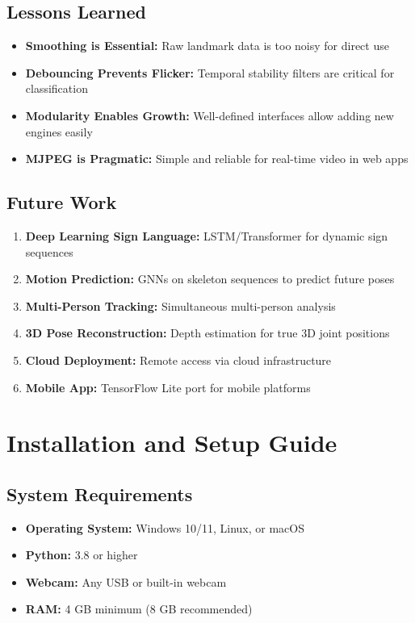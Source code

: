 \documentclass[a4paper,12pt]{report}
\begin{document}
\section{Lessons Learned}
\begin{itemize}
    \item \textbf{Smoothing is Essential:} Raw landmark data is too noisy for direct use
    \item \textbf{Debouncing Prevents Flicker:} Temporal stability filters are critical for classification
    \item \textbf{Modularity Enables Growth:} Well-defined interfaces allow adding new engines easily
    \item \textbf{MJPEG is Pragmatic:} Simple and reliable for real-time video in web apps
\end{itemize}

\section{Future Work}
\begin{enumerate}
    \item \textbf{Deep Learning Sign Language:} LSTM/Transformer for dynamic sign sequences
    \item \textbf{Motion Prediction:} GNNs on skeleton sequences to predict future poses
    \item \textbf{Multi-Person Tracking:} Simultaneous multi-person analysis
    \item \textbf{3D Pose Reconstruction:} Depth estimation for true 3D joint positions
    \item \textbf{Cloud Deployment:} Remote access via cloud infrastructure
    \item \textbf{Mobile App:} TensorFlow Lite port for mobile platforms
\end{enumerate}

\newpage

\appendix

\chapter{Installation and Setup Guide}
\thispagestyle{contentpages}

\section{System Requirements}
\begin{itemize}
    \item \textbf{Operating System:} Windows 10/11, Linux, or macOS
    \item \textbf{Python:} 3.8 or higher
    \item \textbf{Webcam:} Any USB or built-in webcam
    \item \textbf{RAM:} 4 GB minimum (8 GB recommended)
\end{itemize}
\end{document}
